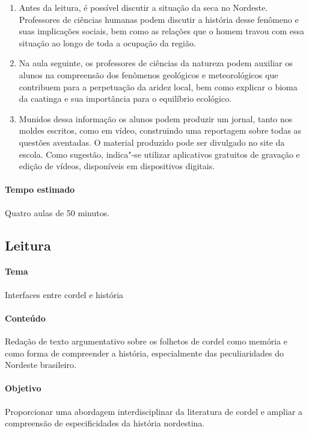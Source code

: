 \documentclass[12pt]{extarticle}
\begin{document}
\begin{enumerate}

\item Antes da leitura, é possível discutir a situação da seca no Nordeste.
  Professores de ciências humanas podem discutir a história desse fenômeno
  e suas implicações sociais, bem como as relações que o homem travou com essa
  situação ao longo de toda a ocupação da região.

\item Na aula seguinte, os professores de ciências da natureza podem auxiliar
  os alunos na compreensão dos fenômenos geológicos e meteorológicos que
  contribuem para a perpetuação da aridez local, bem como explicar o bioma da
  caatinga e sua importância para o equilíbrio ecológico. 

\item Munidos dessa informação os alunos podem produzir um jornal, tanto nos
  moldes escritos, como em vídeo, construindo uma reportagem sobre todas as
  questões aventadas. O material produzido pode ser divulgado no site da
  escola. Como sugestão, indica"-se utilizar aplicativos gratuitos de gravação
  e edição de vídeos, disponíveis em dispositivos digitais.

\end{enumerate}

\paragraph{Tempo estimado} Quatro aulas de 50 minutos.

\subsection{Leitura}

\paragraph{Tema} Interfaces entre cordel e história

\paragraph{Conteúdo} Redação de texto argumentativo sobre os folhetos de cordel
como memória e como forma de compreender a história, especialmente das
peculiaridades do Nordeste brasileiro.

\paragraph{Objetivo} Proporcionar uma abordagem interdisciplinar da literatura
de cordel e ampliar a compreensão de especificidades da história nordestina.
\end{document}
